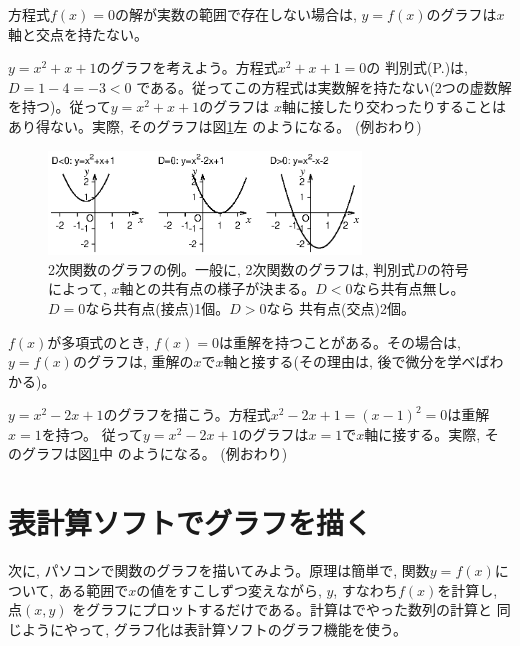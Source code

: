 方程式$f(x)=0$の解が実数の範囲で存在しない場合は, $y=f(x)$のグラフは$x$軸と交点を持たない。

\begin{exmpl}$y=x^2+x+1$のグラフを考えよう。方程式$x^2+x+1=0$の
判別式(P.\pageref{eq:Q(uadratic)_E(quations)_D(iscriminant)})は, $D=1-4=-3<0$
である。従ってこの方程式は実数解を持たない(2つの虚数解を持つ)。従って$y=x^2+x+1$のグラフは
$x$軸に接したり交わったりすることはあり得ない。実際, そのグラフは図\ref{fig:2Dpoly_graph}左
のようになる。
(例おわり)\end{exmpl}\mv
\begin{figure}[h]
    \centering
    \includegraphics[width=8.3cm]{2Dpoly_graph.eps}
    \caption{2次関数のグラフの例。一般に, 2次関数のグラフは, 判別式$D$の符号によって, 
$x$軸との共有点の様子が決まる。$D<0$なら共有点無し。$D=0$なら共有点(接点)1個。$D>0$なら
共有点(交点)2個。
\label{fig:2Dpoly_graph}}
\end{figure}

$f(x)$が多項式のとき, $f(x)=0$は重解を持つことがある。その場合は, $y=f(x)$のグラフは, 
重解の$x$で$x$軸と接する(その理由は, 後で微分を学べばわかる)。
\begin{exmpl}$y=x^2-2x+1$のグラフを描こう。方程式$x^2-2x+1=(x-1)^2=0$は重解$x=1$を持つ。
従って$y=x^2-2x+1$のグラフは$x=1$で$x$軸に接する。実際, そのグラフは図\ref{fig:2Dpoly_graph}中
のようになる。
(例おわり)\end{exmpl}
\hv

\section{表計算ソフトでグラフを描く}

次に, パソコンで関数のグラフを描いてみよう。原理は簡単で, 関数$y=f(x)$について, 
ある範囲で$x$の値をすこしずつ変えながら, $y$, すなわち$f(x)$を計算し, 点$(x,y)$
をグラフにプロットするだけである。計算はでやった数列の計算と
同じようにやって, グラフ化は表計算ソフトのグラフ機能を使う。\hv

